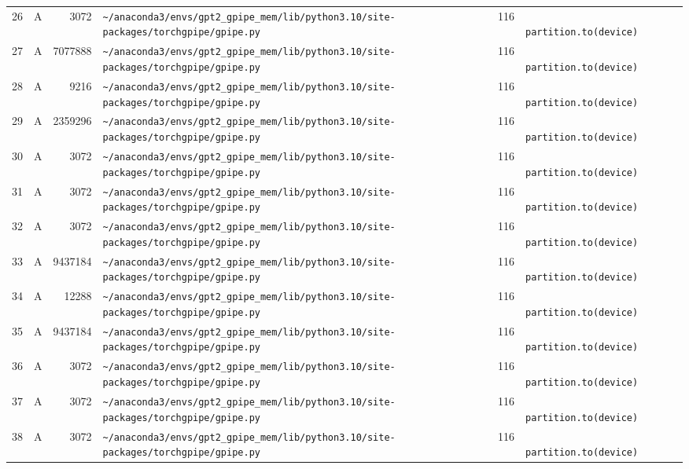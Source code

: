 \documentclass{article}
\begin{document}
\begin{longtable}{r l r p{6.5cm} r p{7.0cm}}
26 & A & 3072 & \lstinline|~/anaconda3/envs/gpt2_gpipe_mem/lib/python3.10/site-packages/torchgpipe/gpipe.py| & 116 & \lstinline|            partition.to(device)| \\
27 & A & 7077888 & \lstinline|~/anaconda3/envs/gpt2_gpipe_mem/lib/python3.10/site-packages/torchgpipe/gpipe.py| & 116 & \lstinline|            partition.to(device)| \\
28 & A & 9216 & \lstinline|~/anaconda3/envs/gpt2_gpipe_mem/lib/python3.10/site-packages/torchgpipe/gpipe.py| & 116 & \lstinline|            partition.to(device)| \\
29 & A & 2359296 & \lstinline|~/anaconda3/envs/gpt2_gpipe_mem/lib/python3.10/site-packages/torchgpipe/gpipe.py| & 116 & \lstinline|            partition.to(device)| \\
30 & A & 3072 & \lstinline|~/anaconda3/envs/gpt2_gpipe_mem/lib/python3.10/site-packages/torchgpipe/gpipe.py| & 116 & \lstinline|            partition.to(device)| \\
31 & A & 3072 & \lstinline|~/anaconda3/envs/gpt2_gpipe_mem/lib/python3.10/site-packages/torchgpipe/gpipe.py| & 116 & \lstinline|            partition.to(device)| \\
32 & A & 3072 & \lstinline|~/anaconda3/envs/gpt2_gpipe_mem/lib/python3.10/site-packages/torchgpipe/gpipe.py| & 116 & \lstinline|            partition.to(device)| \\
33 & A & 9437184 & \lstinline|~/anaconda3/envs/gpt2_gpipe_mem/lib/python3.10/site-packages/torchgpipe/gpipe.py| & 116 & \lstinline|            partition.to(device)| \\
34 & A & 12288 & \lstinline|~/anaconda3/envs/gpt2_gpipe_mem/lib/python3.10/site-packages/torchgpipe/gpipe.py| & 116 & \lstinline|            partition.to(device)| \\
35 & A & 9437184 & \lstinline|~/anaconda3/envs/gpt2_gpipe_mem/lib/python3.10/site-packages/torchgpipe/gpipe.py| & 116 & \lstinline|            partition.to(device)| \\
36 & A & 3072 & \lstinline|~/anaconda3/envs/gpt2_gpipe_mem/lib/python3.10/site-packages/torchgpipe/gpipe.py| & 116 & \lstinline|            partition.to(device)| \\
37 & A & 3072 & \lstinline|~/anaconda3/envs/gpt2_gpipe_mem/lib/python3.10/site-packages/torchgpipe/gpipe.py| & 116 & \lstinline|            partition.to(device)| \\
38 & A & 3072 & \lstinline|~/anaconda3/envs/gpt2_gpipe_mem/lib/python3.10/site-packages/torchgpipe/gpipe.py| & 116 & \lstinline|            partition.to(device)| \\

\end{longtable}
\end{document}
